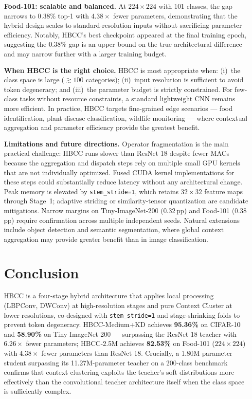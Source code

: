 \documentclass[conference]{IEEEtran}
\begin{document}
\textbf{Food-101: scalable and balanced.}
At $224\!\times\!224$ with 101 classes, the gap narrows to 0.38\% top-1
with $4.38\times$ fewer parameters, demonstrating that the hybrid design
scales to standard-resolution inputs without sacrificing parameter
efficiency. Notably, HBCC's best checkpoint appeared at the final
training epoch, suggesting the 0.38\% gap is an upper bound on the
true architectural difference and may narrow further with a larger
training budget.

\textbf{When HBCC is the right choice.}
HBCC is most appropriate when: (i)~the class space is large
($\gtrsim\!100$ categories); (ii)~input resolution is sufficient to
avoid token degeneracy; and (iii)~the parameter budget is strictly
constrained. For few-class tasks without resource constraints, a
standard lightweight CNN remains more efficient. In practice, HBCC
targets fine-grained edge scenarios --- food identification, plant
disease classification, wildlife monitoring --- where contextual
aggregation and parameter efficiency provide the greatest benefit.

\textbf{Limitations and future directions.}
Operator fragmentation is the main practical challenge: HBCC runs
slower than ResNet-18 despite fewer MACs because the aggregation and
dispatch steps rely on multiple small GPU kernels that are not
individually optimized. Fused CUDA kernel implementations for these
steps could substantially reduce latency without any architectural
change. Peak memory is elevated by \texttt{stem\_stride=1}, which
retains $32\!\times\!32$ feature maps through Stage~1; adaptive
striding or similarity-tensor quantization are candidate mitigations.
Narrow margins on Tiny-ImageNet-200 (0.32\,pp) and Food-101 (0.38\,pp)
require confirmation across multiple independent seeds. Natural
extensions include object detection and semantic segmentation, where
global context aggregation may provide greater benefit than in image
classification.

\section{Conclusion}
\label{sec:conclusion}

HBCC is a four-stage hybrid architecture that applies local processing
(LBPConv, DWConv) at high-resolution stages and pure Context Cluster
at lower resolutions, co-designed with \texttt{stem\_stride=1} and
stage-shrinking folds to prevent token degeneracy.
HBCC-Medium+KD achieves \textbf{95.36\%} on CIFAR-10 and
\textbf{58.90\%} on Tiny-ImageNet-200 --- surpassing the ResNet-18
teacher with $6.26\times$ fewer parameters; HBCC-2.5M achieves
\textbf{82.53\%} on Food-101 ($224\!\times\!224$) with $4.38\times$
fewer parameters than ResNet-18. Crucially, a 1.80M-parameter student
surpassing its 11.27M-parameter teacher on a 200-class benchmark
confirms that context clustering exploits the teacher's soft
distributions more effectively than the convolutional teacher
architecture itself when the class space is sufficiently complex.
\end{document}
